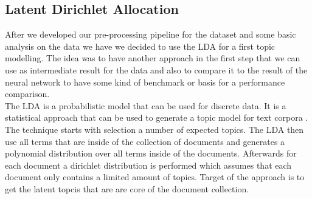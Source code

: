 \subsection{Latent Dirichlet Allocation} %
\label{sub:lda}
After we developed our pre-processing pipeline for the dataset and some basic analysis on the data we have we decided to use the LDA for a first topic modelling. The idea was to have another approach in the first step that we can use as intermediate result for the data and also to compare it to the result of the neural network to have some kind of benchmark or basis for a performance comparison.\\
The LDA is a probabilistic model that can be used for discrete data. It is a statistical approach that can be used to generate a topic model for text corpora \cite{blei_latent_nodate}. The technique starts with selection a number of expected topics. The LDA then use all terms that are inside of the collection of documents and generates a polynomial distribution over all terms inside of the documents. Afterwards for each document a dirichlet distribution is performed which assumes that each document only contains a limited amount of topics. Target of the approach is to get the latent topcis that are are core of the document collection.
